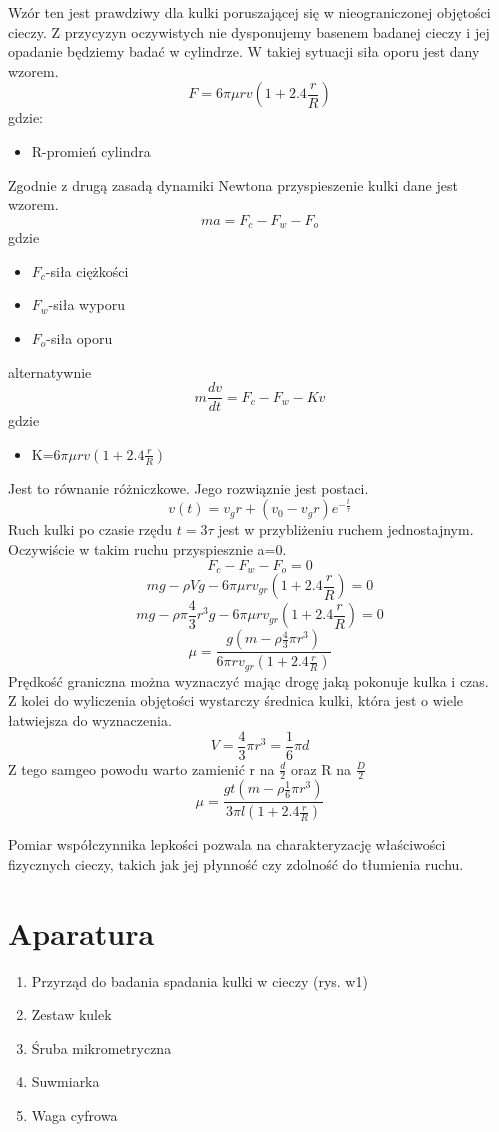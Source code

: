 \documentclass{article}
\begin{document}
\vspace{0.5cm}
Wzór ten jest prawdziwy dla kulki poruszającej się w nieograniczonej objętości cieczy. Z przycyzyn oczywistych nie dysponujemy basenem badanej cieczy i jej opadanie będziemy badać w cylindrze. W takiej sytuacji siła oporu jest dany wzorem.
\[F=6\pi\mu rv(1+2.4\frac{r}{R})\]
gdzie:
\begin{itemize}
    \item R-promień cylindra
\end{itemize}
Zgodnie z drugą zasadą dynamiki Newtona przyspieszenie kulki dane jest wzorem.
\[ma=F_c-F_w-F_o\]
gdzie
\begin{itemize}
    \item $F_c$-siła ciężkości
    \item $F_w$-siła wyporu
    \item $F_o$-siła oporu
\end{itemize}
alternatywnie
\[m\frac{dv}{dt}=F_c-F_w-Kv\]
gdzie
\begin{itemize}
    \item K=$6\pi\mu rv(1+2.4\frac{r}{R})$
\end{itemize}
Jest to równanie różniczkowe. Jego rozwiąznie jest postaci.
\[v(t)=v_gr+(v_0-v_gr)e^{-\frac{t}{\tau}}\]
Ruch kulki po czasie rzędu $t=3\tau$ jest w przybliżeniu ruchem jednostajnym. Oczywiście w takim ruchu przyspiesznie a=0.
\[F_c-F_w-F_o=0\]
\[mg-\rho Vg-6\pi\mu rv_{gr}(1+2.4\frac{r}{R})=0\]
\[mg-\rho\pi\frac{4}{3}r^3g-6\pi\mu rv_{gr}(1+2.4\frac{r}{R})=0\]
\[\mu=\frac{g(m-\rho\frac{4}{3}\pi r^3)}{6\pi rv_{gr}(1+2.4\frac{r}{R})}\]
Prędkość graniczna można wyznaczyć mając drogę jaką pokonuje kulka i czas.\\
Z kolei do wyliczenia objętości wystarczy średnica kulki, która jest o wiele łatwiejsza do wyznaczenia.
\[V=\frac{4}{3}\pi r^3=\frac{1}{6}\pi d\]
Z tego samgeo powodu warto zamienić r na $\frac{d}{2}$ oraz R na $\frac{D}{2}$
\[\mu=\frac{gt(m-\rho\frac{1}{6}\pi r^3)}{3\pi l(1+2.4\frac{r}{R})}\]

Pomiar współczynnika lepkości pozwala na charakteryzację właściwości fizycznych cieczy, takich jak jej płynność czy zdolność do tłumienia ruchu.


\section{Aparatura}

\begin{enumerate}
    \item Przyrząd do badania spadania kulki w cieczy (rys. w1)
    \item Zestaw kulek
    \item Śruba mikrometryczna
    \item Suwmiarka
    \item Waga cyfrowa
\end{enumerate}
\end{document}
